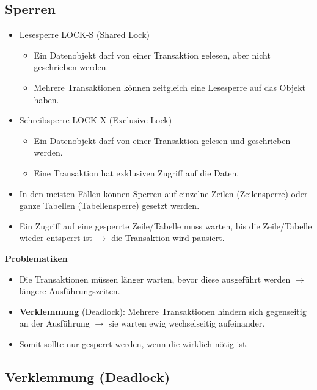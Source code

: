         \subsection{Sperren} %
            \begin{itemize}
            	\item Lesesperre LOCK-S (Shared Lock)
            		\begin{itemize}
            			\item Ein Datenobjekt darf von einer Transaktion gelesen, aber nicht geschrieben werden.
            			\item Mehrere Transaktionen können zeitgleich eine Lesesperre auf das Objekt haben.
            		\end{itemize}
            	\item Schreibsperre LOCK-X (Exclusive Lock)
            		\begin{itemize}
            			\item Ein Datenobjekt darf von einer Transaktion gelesen und geschrieben werden.
            			\item Eine Transaktion hat exklusiven Zugriff auf die Daten.
            		\end{itemize}
            	\item In den meisten Fällen können Sperren auf einzelne Zeilen (Zeilensperre) oder ganze Tabellen (Tabellensperre) gesetzt werden.
            	\item Ein Zugriff auf eine gesperrte Zeile/Tabelle muss warten, bis die Zeile/Tabelle wieder entsperrt ist \(\rightarrow\) die Transaktion wird pausiert.
            \end{itemize}
        
        	\textbf{Problematiken}
        	\begin{itemize}
        		\item Die Transaktionen müssen länger warten, bevor diese ausgeführt werden \(\rightarrow\) längere Ausführungszeiten.
        		\item \textbf{Verklemmung} (Deadlock): Mehrere Transaktionen hindern sich gegenseitig an der Ausführung \(\rightarrow\) sie warten ewig wechselseitig aufeinander.
        		\item Somit sollte nur gesperrt werden, wenn die wirklich nötig ist.
        	\end{itemize}

        \subsection{Verklemmung (Deadlock)} %
        	\label{sec:deadlock}
        
